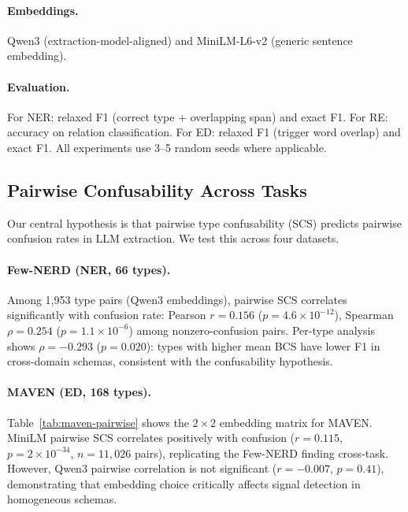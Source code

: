 \documentclass[11pt,a4paper]{article}
\begin{document}
\paragraph{Embeddings.}
Qwen3 (extraction-model-aligned) and MiniLM-L6-v2 (generic sentence embedding).

\paragraph{Evaluation.}
For NER: relaxed F1 (correct type + overlapping span) and exact F1.
For RE: accuracy on relation classification.
For ED: relaxed F1 (trigger word overlap) and exact F1.
All experiments use 3--5 random seeds where applicable.

\subsection{Pairwise Confusability Across Tasks}
\label{sec:pairwise}

Our central hypothesis is that pairwise type confusability (SCS) predicts pairwise confusion rates in LLM extraction.
We test this across four datasets.

\paragraph{Few-NERD (NER, 66 types).}
Among 1,953 type pairs (Qwen3 embeddings), pairwise SCS correlates significantly with confusion rate: Pearson $r{=}0.156$ ($p{=}4.6 \times 10^{-12}$), Spearman $\rho{=}0.254$ ($p{=}1.1 \times 10^{-6}$) among nonzero-confusion pairs.
Per-type analysis shows $\rho{=}-0.293$ ($p{=}0.020$): types with higher mean BCS have lower F1 in cross-domain schemas, consistent with the confusability hypothesis.

\paragraph{MAVEN (ED, 168 types).}
Table~\ref{tab:maven-pairwise} shows the $2{\times}2$ embedding matrix for MAVEN.
MiniLM pairwise SCS correlates positively with confusion ($r{=}0.115$, $p{=}2 \times 10^{-34}$, $n{=}11{,}026$ pairs), replicating the Few-NERD finding cross-task.
However, Qwen3 pairwise correlation is not significant ($r{=}-0.007$, $p{=}0.41$), demonstrating that embedding choice critically affects signal detection in homogeneous schemas.
\end{document}
